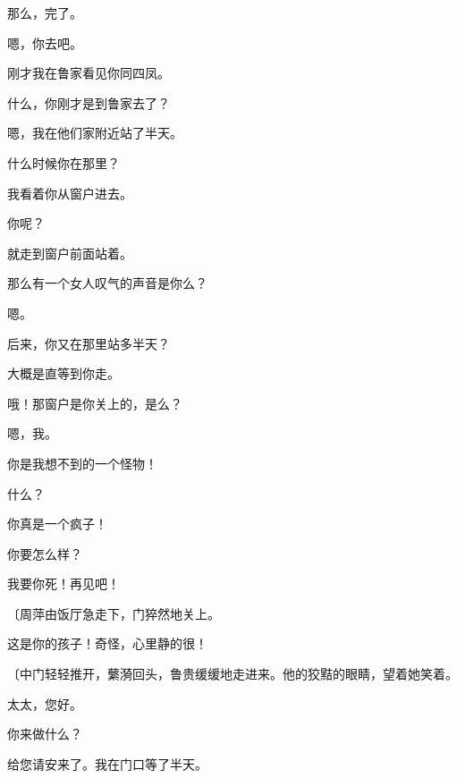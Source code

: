 那么，完了。

嗯，你去吧。

刚才我在鲁家看见你同四凤。

什么，你刚才是到鲁家去了？

嗯，我在他们家附近站了半天。

什么时候你在那里？

我看着你从窗户进去。

你呢？

就走到窗户前面站着。

那么有一个女人叹气的声音是你么？

嗯。

后来，你又在那里站多半天？

大概是直等到你走。

哦！那窗户是你关上的，是么？

嗯，我。

你是我想不到的一个怪物！

什么？

你真是一个疯子！

你要怎么样？

我要你死！再见吧！

{\fangsong〔周萍由饭厅急走下，门猝然地关上。}

这是你的孩子！奇怪，心里静的很！

{\fangsong〔中门轻轻推开，蘩漪回头，鲁贵缓缓地走进来。他的狡黠的眼睛，望着她笑着。}

太太，您好。

你来做什么？

给您请安来了。我在门口等了半天。


